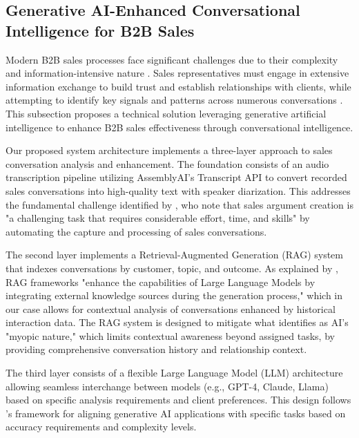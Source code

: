 \subsection{Generative AI-Enhanced Conversational Intelligence for B2B Sales}

Modern B2B sales processes face significant challenges due to their complexity and information-intensive nature \cite{rodriguez2020digitalization, agnihotri2012bringing}. Sales representatives must engage in extensive information exchange to build trust and establish relationships with clients, while attempting to identify key signals and patterns across numerous conversations \cite{morgan1994commitment}. This subsection proposes a technical solution leveraging generative artificial intelligence to enhance B2B sales effectiveness through conversational intelligence.

Our proposed system architecture implements a three-layer approach to sales conversation analysis and enhancement. The foundation consists of an audio transcription pipeline utilizing AssemblyAI's Transcript API to convert recorded sales conversations into high-quality text with speaker diarization. This addresses the fundamental challenge identified by \cite{elhissoufi2024leveraging}, who note that sales argument creation is "a challenging task that requires considerable effort, time, and skills" by automating the capture and processing of sales conversations.

The second layer implements a Retrieval-Augmented Generation (RAG) system that indexes conversations by customer, topic, and outcome. As explained by \cite{salmi2024current}, RAG frameworks "enhance the capabilities of Large Language Models by integrating external knowledge sources during the generation process," which in our case allows for contextual analysis of conversations enhanced by historical interaction data. The RAG system is designed to mitigate what \cite{kemp2023competitive} identifies as AI's "myopic nature," which limits contextual awareness beyond assigned tasks, by providing comprehensive conversation history and relationship context.

The third layer consists of a flexible Large Language Model (LLM) architecture allowing seamless interchange between models (e.g., GPT-4, Claude, Llama) based on specific analysis requirements and client preferences. This design follows \cite{piller2024generative}'s framework for aligning generative AI applications with specific tasks based on accuracy requirements and complexity levels.

